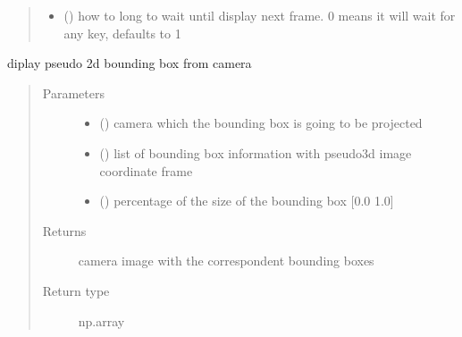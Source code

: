 \documentclass[letterpaper,10pt,english]{sphinxmanual}
\begin{document}
\begin{fulllineitems}
\begin{fulllineitems}
\begin{quote}
\begin{description}
\begin{itemize}
\item {} 
 (\sphinxstyleliteralemphasis{\sphinxupquote{, }}) \textendash{} how to long to wait until display next frame. 0 means it will wait for any key, defaults to 1

\end{itemize}

\end{description}\end{quote}

\end{fulllineitems}


\begin{fulllineitems}
\label{\detokenize{radiate:radiate.Sequence.vis_bbox_cam}}
diplay pseudo 2d bounding box from camera
\begin{quote}\begin{description}
\item[{Parameters}] \leavevmode\begin{itemize}
\item {} 
 () \textendash{} camera which the bounding box is going to be projected

\item {} 
 () \textendash{} list of bounding box information with pseudo\sphinxhyphen{}3d image coordinate frame

\item {} 
 () \textendash{} percentage of the size of the bounding box {[}0.0 1.0{]}

\end{itemize}

\item[{Returns}] \leavevmode
camera image with the correspondent bounding boxes

\item[{Return type}] \leavevmode
np.array

\end{description}\end{quote}

\end{fulllineitems}


\end{fulllineitems}
\end{document}
